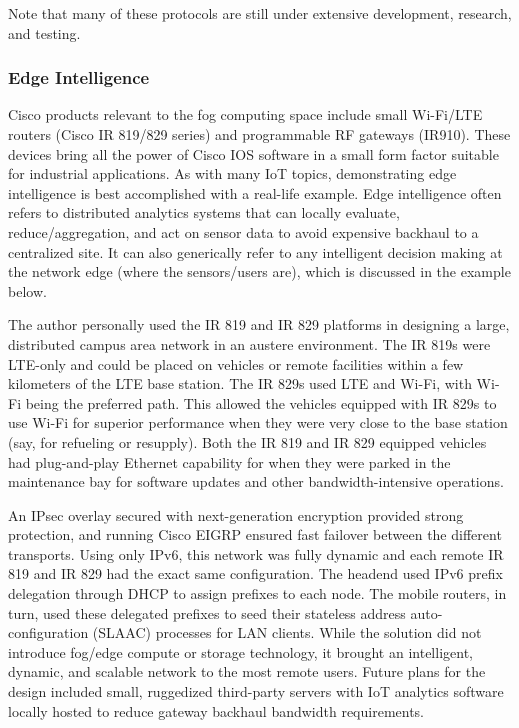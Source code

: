 Note that many of these protocols are still under extensive development,
research, and testing.

\subsubsection{Edge Intelligence}
Cisco products relevant to the fog computing space include small Wi-Fi/LTE
routers (Cisco IR 819/829 series) and programmable RF gateways (IR910). These
devices bring all the power of Cisco IOS software in a small form factor
suitable for industrial applications. As with many IoT topics, demonstrating
edge intelligence is best accomplished with a real-life example. Edge
intelligence often refers to distributed analytics systems that can locally
evaluate, reduce/aggregation, and act on sensor data to avoid expensive
backhaul to a centralized site. It can also generically refer to any
intelligent decision making at the network edge (where the sensors/users are),
which is discussed in the example below.

The author personally used the IR 819 and IR 829 platforms in designing a
large, distributed campus area network in an austere environment. The IR 819s
were LTE-only and could be placed on vehicles or remote facilities within a
few kilometers of the LTE base station. The IR 829s used LTE and Wi-Fi, with
Wi-Fi being the preferred path. This allowed the vehicles equipped with IR
829s to use Wi-Fi for superior performance when they were very close to the
base station (say, for refueling or resupply). Both the IR 819 and IR 829
equipped vehicles had plug-and-play Ethernet capability for when they were
parked in the maintenance bay for software updates and other
bandwidth-intensive operations.

An IPsec overlay secured with next-generation encryption provided strong
protection, and running Cisco EIGRP ensured fast failover between the
different transports. Using only IPv6, this network was fully dynamic and each
remote IR 819 and IR 829 had the exact same configuration. The headend used
IPv6 prefix delegation through DHCP to assign prefixes to each node. The
mobile routers, in turn, used these delegated prefixes to seed their stateless
address auto-configuration (SLAAC) processes for LAN clients. While the
solution did not introduce fog/edge compute or storage technology, it brought
an intelligent, dynamic, and scalable network to the most remote users. Future
plans for the design included small, ruggedized third-party servers with IoT
analytics software locally hosted to reduce gateway backhaul bandwidth
requirements.

